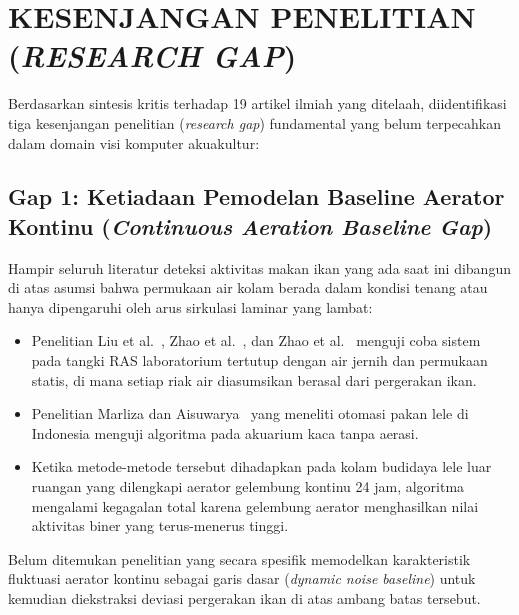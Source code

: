 \section{KESENJANGAN PENELITIAN (\textit{RESEARCH GAP})}
\label{sec:research-gap}

Berdasarkan sintesis kritis terhadap 19 artikel ilmiah yang ditelaah, diidentifikasi tiga kesenjangan penelitian (\textit{research gap}) fundamental yang belum terpecahkan dalam domain visi komputer akuakultur:

\subsection{Gap 1: Ketiadaan Pemodelan Baseline Aerator Kontinu (\textit{Continuous Aeration Baseline Gap})}
Hampir seluruh literatur deteksi aktivitas makan ikan yang ada saat ini dibangun di atas asumsi bahwa permukaan air kolam berada dalam kondisi tenang atau hanya dipengaruhi oleh arus sirkulasi laminar yang lambat:
\begin{itemize}
    \item Penelitian Liu et al.~\cite{Liu2014}, Zhao et al.~\cite{Zhao2016}, dan Zhao et al.~\cite{Zhao2017} menguji coba sistem pada tangki RAS laboratorium tertutup dengan air jernih dan permukaan statis, di mana setiap riak air diasumsikan berasal dari pergerakan ikan.
    \item Penelitian Marliza dan Aisuwarya~\cite{Marliza2021} yang meneliti otomasi pakan lele di Indonesia menguji algoritma pada akuarium kaca tanpa aerasi.
    \item Ketika metode-metode tersebut dihadapkan pada kolam budidaya lele luar ruangan yang dilengkapi aerator gelembung kontinu 24 jam, algoritma mengalami kegagalan total karena gelembung aerator menghasilkan nilai aktivitas biner yang terus-menerus tinggi.
\end{itemize}
Belum ditemukan penelitian yang secara spesifik memodelkan karakteristik fluktuasi aerator kontinu sebagai garis dasar (\textit{dynamic noise baseline}) untuk kemudian diekstraksi deviasi pergerakan ikan di atas ambang batas tersebut.

